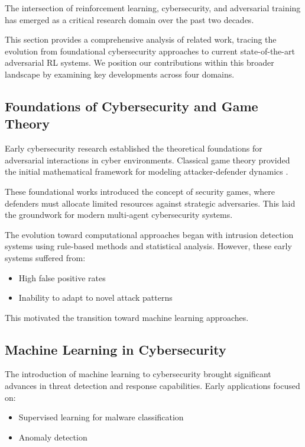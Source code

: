 \documentclass[12pt,oneside,a4paper]{article}
\theoremstyle{definition}
\theoremstyle{plain}
\begin{document}
The intersection of reinforcement learning, cybersecurity, and adversarial training has emerged as a critical research domain over the past two decades. 

This section provides a comprehensive analysis of related work, tracing the evolution from foundational cybersecurity approaches to current state-of-the-art adversarial RL systems. We position our contributions within this broader landscape by examining key developments across four domains.

\subsection{Foundations of Cybersecurity and Game Theory}

Early cybersecurity research established the theoretical foundations for adversarial interactions in cyber environments. Classical game theory provided the initial mathematical framework for modeling attacker-defender dynamics \citep{alpcan2010network}. 

These foundational works introduced the concept of security games, where defenders must allocate limited resources against strategic adversaries. This laid the groundwork for modern multi-agent cybersecurity systems.

The evolution toward computational approaches began with intrusion detection systems using rule-based methods and statistical analysis. However, these early systems suffered from:
\begin{itemize}
    \item High false positive rates
    \item Inability to adapt to novel attack patterns \citep{sommer2010outside}
\end{itemize}

This motivated the transition toward machine learning approaches.

\subsection{Machine Learning in Cybersecurity}

The introduction of machine learning to cybersecurity brought significant advances in threat detection and response capabilities. Early applications focused on:
\begin{itemize}
    \item Supervised learning for malware classification
    \item Anomaly detection \citep{sommer2010outside}
\end{itemize}
\end{document}
